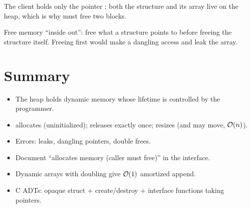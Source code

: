 \begin{center}
\end{center}
The client holds only the pointer ; both the structure and its array live on the heap,
which is why  must free two blocks.

\begin{important}
Free memory ``inside out'': free what a structure points to before freeing the structure itself.
Freeing  first would make  a dangling access and leak the array.
\end{important}

\section{Summary}
\begin{itemize}
  \item The heap holds dynamic memory whose lifetime is controlled by the programmer.
  \item {} allocates (uninitialized);  releases exactly once;
     resizes (and may move, $\mathcal{O}(n)$).
  \item Errors: leaks, dangling pointers, double frees.
  \item Document ``allocates memory (caller must free)'' in the interface.
  \item Dynamic arrays with doubling give $\mathcal{O}(1)$ amortized append.
  \item C ADTs: opaque struct + create/destroy + interface functions taking pointers.
\end{itemize}
